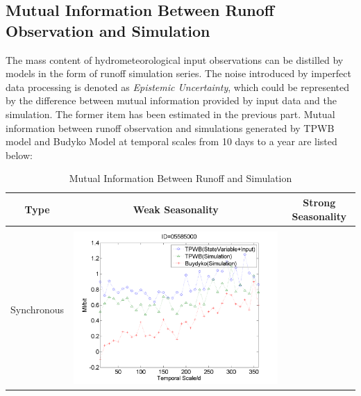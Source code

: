 \documentclass[draft,wrr]{AGUTeX}
\begin{document}
\begin{article}
\subsection{Mutual Information Between Runoff Observation and Simulation}
The mass content of hydrometeorological input observations can be distilled by models in the form of runoff simulation series. The noise introduced by imperfect data processing is denoted as \emph{Epistemic Uncertainty}, which could be represented by the difference between  mutual information provided by input data and  the simulation. The former item has been estimated in the previous part. Mutual information between runoff observation and simulations  generated by TPWB model and Budyko Model at temporal scales from 10 days to a year are listed below: 
\begin{table}[H]\small
\caption{Mutual Information Between Runoff and Simulation}
\label{sm}
\resizebox{\textwidth}{!}
{
\centering
\begin{tabular}{ccc}
\hline
Type& Weak Seasonality & Strong Seasonality \\\hline
\\
Synchronous
&\begin{minipage}{.6\textwidth}\includegraphics[width=\linewidth]{resultgraph/05585000MI.png}\end{minipage}


\end{tabular}}
\end{table}
\end{article}
\end{document}
